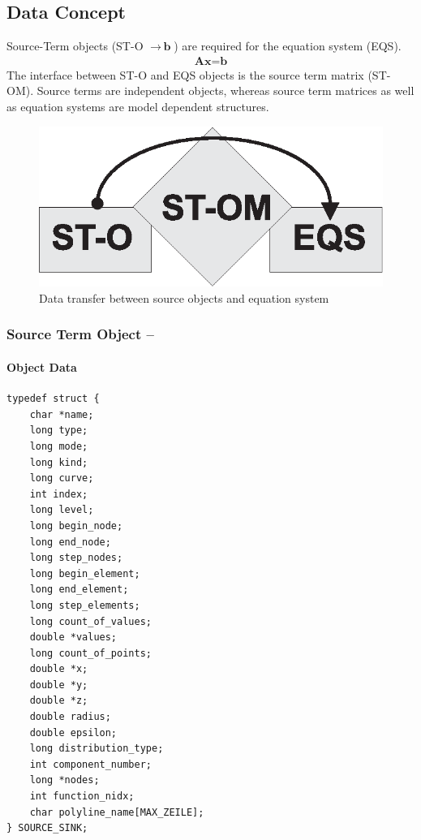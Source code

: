 \subsection{Data Concept}

Source-Term objects (ST-O $\rightarrow \, \textbf{b}$) are required for the equation system
(EQS).
\begin{eqnarray}
\textbf{A}
\textbf{x}
=
\textbf{b}
\end{eqnarray}
%
The interface between ST-O and EQS objects is the source term
matrix (ST-OM).
Source terms are independent objects, whereas source term
matrices as well as equation systems are model dependent
structures.
\begin{figure}[htb!]
\begin{center}
\footnotesize
\includegraphics[width=0.4\columnwidth]{figures/ob_st.eps}  %
\caption{Data transfer between source objects and equation system}
\label{fig:st1}
\end{center}
\end{figure}
%


\subsubsection{Source Term Object -- }

\paragraph{Object Data}

\footnotesize
\begin{verbatim}
typedef struct {
    char *name;
    long type;
    long mode;
    long kind;
    long curve;
    int index;
    long level;
    long begin_node;
    long end_node;
    long step_nodes;
    long begin_element;
    long end_element;
    long step_elements;
    long count_of_values;
    double *values;
    long count_of_points;
    double *x;
    double *y;
    double *z;
    double radius;
    double epsilon;
    long distribution_type;
    int component_number;
    long *nodes;
    int function_nidx;
    char polyline_name[MAX_ZEILE];
} SOURCE_SINK;
\end{verbatim}
\normalsize

